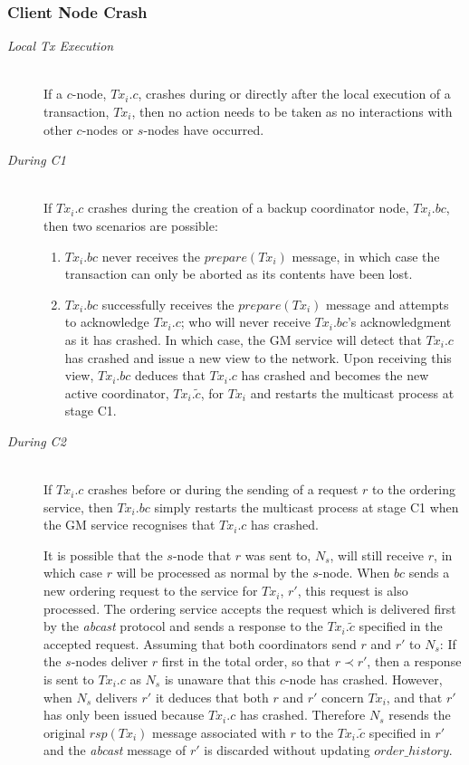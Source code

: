     \subsubsection*{Client Node Crash}
	\begin{description}
         \item[\emph{Local Tx Execution}]  \hfill \\
         If a $c$-node, $Tx_i.c$, crashes during or directly after the local execution of a transaction, $Tx_i$, then no action needs to be taken as no interactions with other $c$-nodes or $s$-nodes have occurred.  
		
		\item[\emph{During C1}]  \hfill \\
		If $Tx_i.c$ crashes during the creation of a backup coordinator node, $Tx_i.bc$, then two scenarios are possible:
		    \begin{enumerate}[label=\roman*]
			    \item    $Tx_i.bc$ never receives the $prepare(Tx_i)$ message, in which case the transaction  can only be aborted as its contents have been lost.  
			    \item    $Tx_i.bc$ successfully receives the $prepare(Tx_i)$ message and attempts to acknowledge $Tx_i.c$; who will never receive $Tx_i.bc$'s acknowledgment as it has crashed.  In which case, the GM service will detect that $Tx_i.c$ has crashed and issue a new view to the network.  Upon receiving this view, $Tx_i.bc$ deduces that $Tx_i.c$ has crashed and becomes the new active coordinator, $Tx_i.\tilde{c}$, for $Tx_i$ and restarts the multicast process at stage C1.  
		    \end{enumerate}     
		    
		\item[\emph{During C2}]  \hfill \\
        If $Tx_i.c$ crashes before or during the sending of a request $r$ to the ordering service, then $Tx_i.bc$ simply restarts the multicast process at stage C1 when the GM service recognises that $Tx_i.c$ has crashed.  
        
        It is possible that the $s$-node that $r$ was sent to, $N_s$, will still receive $r$, in which case $r$ will be processed as normal by the $s$-node.  When $bc$ sends a new ordering request to the service for $Tx_i$, $r'$, this request is also processed.  The ordering service accepts the request which is delivered first by the \emph{abcast} protocol and sends a response to the $Tx_i.\tilde{c}$ specified in the accepted request.  Assuming that both coordinators send $r$ and $r'$ to $N_s$: If the $s$-nodes deliver $r$ first in the total order, so that $r \prec r'$, then a response is sent to $Tx_i.c$ as $N_s$ is unaware that this $c$-node has crashed.  However, when $N_s$ delivers $r'$ it deduces that both $r$ and $r'$ concern $Tx_i$, and that $r'$ has only been issued because $Tx_i.c$ has crashed.  Therefore $N_s$ resends the original $rsp(Tx_i)$ message associated with $r$ to the $Tx_i.\tilde{c}$ specified in $r'$ and the \emph{abcast} message of $r'$ is discarded without updating $order\_history$.  
        

\end{description}
